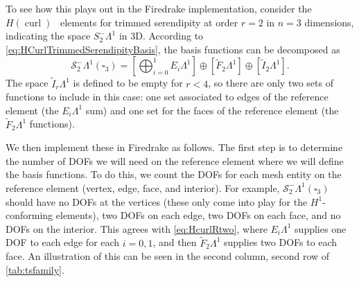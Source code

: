 \documentclass[format=acmsmall,screen,timestamp=false,a4paper]{acmart}
\DeclareMathOperator{\curl}{curl}
\newcommand\josh[1]{\textbf{\textcolor[rgb]{0,.5,1}{[Josh: #1]}}}
\newcommand\lm[1]{\textbf{\textcolor[rgb]{1,0,0.5}{[Lawrence: #1]}}}
\newcommand{\calS}{\mathcal{S}}
\newcommand{\hcurl}{\ensuremath{{H}(\curl ) } }
\begin{document}
 
To see how this plays out in the Firedrake implementation, consider the \hcurl~elements for trimmed serendipity at order $r=2$ in $n=3$ dimensions, indicating the space $S_2^- \Lambda^1$ in 3D. According to \cref{eq:HCurlTrimmedSerendipityBasis}, the basis functions can be decomposed as
\begin{equation}\label{eq:HcurlRtwo}
   \calS^-_2\Lambda^1(\square_3) =    \left[\bigoplus_{i=0}^{1} E_i \Lambda^1\right] \oplus \left[\tilde{F}_2 \Lambda^1\right]\oplus \left[\tilde{I}_2 \Lambda^1\right].
   \end{equation}
The space $\tilde{I}_r \Lambda^1$ is defined to be empty for $r<4$, so there are only two sets of functions to include in this case: one set associated to edges of the reference element (the $E_i\Lambda^1$ sum) and one set for the faces of the reference element (the $\tilde{F}_2\Lambda^1$ functions).

We then implement these in Firedrake as follows.  The first step is to determine the number of DOFs we will need on the reference element where we will define the basis functions.  To do this, we count the DOFs for each mesh entity on the reference element (vertex, edge, face, and interior).  For example, $\mathcal{S}_2^- \Lambda^1(\square_3)$ should have no DOFs at the vertices (these only come into play for the $H^1$-conforming elements), two DOFs on each edge, two DOFs on each face, and no DOFs on the interior.  This agrees with \cref{eq:HcurlRtwo}, where $E_i\Lambda^1$ supplies one DOF to each edge for each $i=0, 1$, and then $\tilde{F}_2\Lambda^1$ supplies two DOFs to each face.  An illustration of this can be seen in the second column, second row of \cref{tab:tsfamily}.
\end{document}
